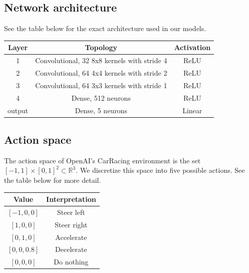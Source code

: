 \documentclass{article}
\begin{document}
\subsection{Network architecture}
See the table below for the exact architecture used in our models. 
\begin{table}[h!]
  \begin{center}
    \begin{tabular}{c|c|c}
      \textbf{Layer} & \textbf{Topology} & \textbf{Activation}\\
      \hline
      1 & Convolutional, 32 8x8 kernels with stride 4 & ReLU \\
      2 & Convolutional, 64 4x4 kernels with stride 2 & ReLU \\      
      3 & Convolutional, 64 3x3 kernels with stride 1 & ReLU \\
      4 & Dense, 512 neurons & ReLU \\
      output & Dense, 5 neurons & Linear \\
    \end{tabular}
    \vspace{0.1cm}
    \label{tab:network_architecture}
  \end{center}
\end{table}

\subsection{Action space}
The action space of OpenAI's CarRacing environment is the set $[-1,1]
\times [0,1]^2 \subset \mathbb{R}^3$. We discretize this space into
five possible actions. See the table below for more detail.  
\begin{table}[h!]
  \begin{center}
    \begin{tabular}{c|c}
      \textbf{Value} & \textbf{Interpretation} \\
      \hline
      $[-1,0,0]$ & Steer left \\
      $[1,0,0]$ & Steer right \\
      $[0,1,0]$ & Accelerate \\
      $[0,0,0.8]$ & Decelerate \\
      $[0,0,0]$ & Do nothing \\
    \end{tabular}
    \vspace{0.1cm}
    \label{tab:actions}
  \end{center}
\end{table}
\end{document}
